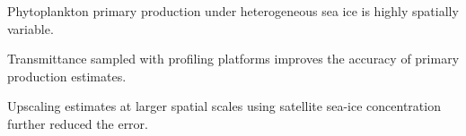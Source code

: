 \documentclass[draft]{agujournal2018}
\begin{document}







\begin{keypoints}
	\item Phytoplankton primary production under heterogeneous sea ice is highly spatially variable.
	\item Transmittance sampled with profiling platforms improves the accuracy of primary production estimates.
	\item Upscaling estimates at larger spatial scales using satellite sea-ice concentration further reduced the error.
\end{keypoints}

%
%

\end{document}
